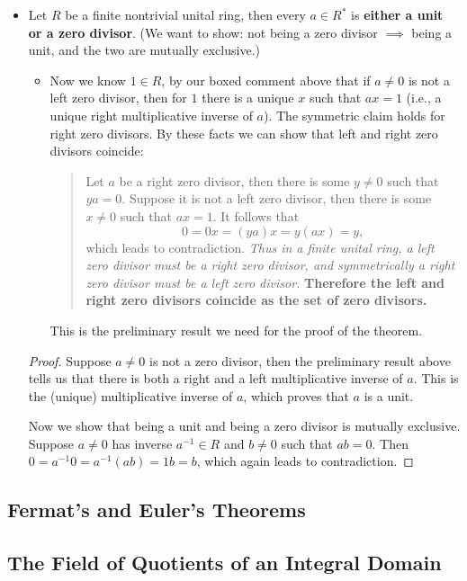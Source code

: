 \documentclass[11pt]{article}
\begin{document}
\begin{itemize}
    \item Let $R$ be a finite nontrivial unital ring, then every $a \in R^*$ is \textbf{either a unit or a zero divisor}. (We want to show: not being a zero divisor $\implies$ being a unit, and the two are mutually exclusive.)
    \begin{itemize}
        \item Now we know $1 \in R$, by our boxed comment above that if $a \neq 0$ is not a left zero divisor, then for $1$ there is a unique $x$ such that $ax=1$ (i.e., a unique right multiplicative inverse of $a$). The symmetric claim holds for right zero divisors. By these facts we can show that left and right zero divisors coincide:
        \begin{quote}
            Let $a$ be a right zero divisor, then there is some $y \neq 0$ such that $ya=0$. Suppose it is not a left zero divisor, then there is some $x \neq 0$ such that $ax = 1$. It follows that \[0=0x=(ya)x=y(ax)=y,\] which leads to contradiction. \emph{Thus in a finite unital ring, a left zero divisor must be a right zero divisor, and symmetrically a right zero divisor must be a left zero divisor.} \textbf{Therefore the left and right zero divisors coincide as the set of zero divisors.}
        \end{quote}
        This is the preliminary result we need for the proof of the theorem.
    \end{itemize}
    \begin{proof}
        Suppose $a \neq 0$ is not a zero divisor, then the preliminary result above tells us that there is both a right and a left multiplicative inverse of $a$. This is the (unique) multiplicative inverse of $a$, which proves that $a$ is a unit.

        Now we show that being a unit and being a zero divisor is mutually exclusive. Suppose $a \neq 0$ has inverse $a^{-1} \in R$ and $b \neq 0$ such that $ab=0$. Then $0 = a^{-1}0 = a^{-1}(ab) = 1b = b$, which again leads to contradiction.
    \end{proof}
\end{itemize}

\subsection{Fermat's and Euler's Theorems}
\subsection{The Field of Quotients of an Integral Domain}
\end{document}
